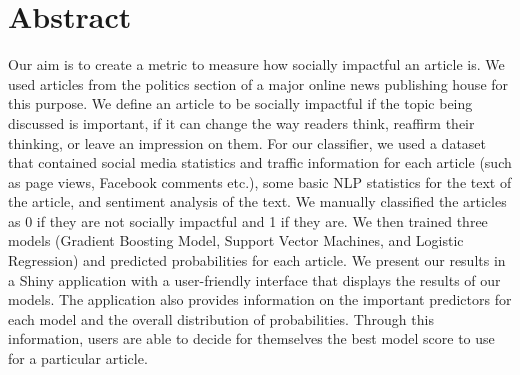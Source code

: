 \documentclass[10pt,letterpaper]{article}
\date{}
\newcommand{\getIndex}[2]{
  \ForEach{,}{\IfEq{#1}{\thislevelitem}{\number\thislevelcount\ExitForEach}{}}{#2}
}
\newcommand{\getAff}[1]{
  \getIndex{#1}{}
}
\begin{document}
\vspace*{0.2in}

\section*{Abstract}
Our aim is to create a metric to measure how socially impactful an
article is. We used articles from the politics section of a major online
news publishing house for this purpose. We define an article to be
socially impactful if the topic being discussed is important, if it can
change the way readers think, reaffirm their thinking, or leave an
impression on them. For our classifier, we used a dataset that contained
social media statistics and traffic information for each article (such
as page views, Facebook comments etc.), some basic NLP statistics for
the text of the article, and sentiment analysis of the text. We manually
classified the articles as 0 if they are not socially impactful and 1 if
they are. We then trained three models (Gradient Boosting Model, Support
Vector Machines, and Logistic Regression) and predicted probabilities
for each article. We present our results in a Shiny application with a
user-friendly interface that displays the results of our models. The
application also provides information on the important predictors for
each model and the overall distribution of probabilities. Through this
information, users are able to decide for themselves the best model
score to use for a particular article.

\end{document}
